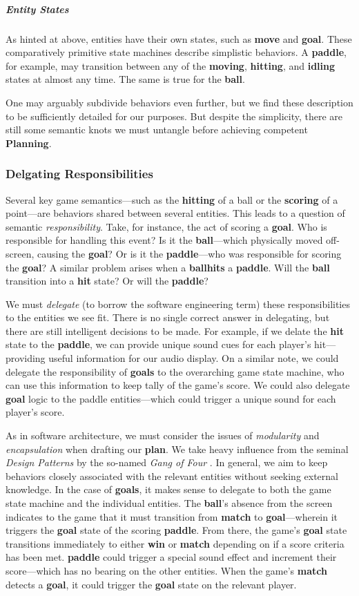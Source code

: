 \documentclass{report}
\newcommand{\plan}{\textbf{Planning}\xspace}
\newcommand{\state}[1]{\textbf{#1}}
\newcommand{\pad}{\textbf{paddle}\xspace}
\newcommand{\ball}{\textbf{ball}\xspace}
\begin{document}
\subparagraph{Entity States}
As hinted at above, entities have their own states, such as \state{move} and \state{goal}. These comparatively primitive state machines describe simplistic behaviors. A \pad, for example, may transition between any of the  \state{moving}, \state{hitting}, and \state{idling} states at almost any time. The same is true for the \ball.

One may arguably subdivide behaviors even further, but we find these description to be sufficiently detailed for our purposes. But despite the simplicity, there are still some semantic knots we must untangle before achieving competent \plan. 

\subsubsection{Delgating Responsibilities}

Several key game semantics---such as the \state{hitting} of a ball or the \state{scoring} of a point---are behaviors shared between several entities. This leads to a question of semantic \emph{responsibility}. Take, for instance, the act of scoring a \state{goal}. Who is responsible for handling this event? Is it the \ball---which physically moved off-screen, causing the \state{goal}? Or is it the \pad---who was responsible for scoring the \state{goal}? A similar problem arises when a \ball \state{hits} a \pad. Will the \ball transition into a \state{hit} state? Or will the \pad? 

We must \emph{delegate} (to borrow the software engineering term) these responsibilities to the entities we see fit. There is no single correct answer in delegating, but there are still intelligent decisions to be made. For example, if we delate the \state{hit} state to the \pad, we can provide unique sound cues for each player's hit---providing useful information for our audio display. On a similar note, we could delegate the responsibility of \state{goals} to the overarching game state machine, who can use this information to keep tally of the game's score. We could also delegate \state{goal} logic to the paddle entities---which could trigger a unique sound for each player's score.

As in software architecture, we must consider the issues of \emph{modularity} and \emph{encapsulation} when drafting our \state{plan}. We take heavy influence from the seminal \emph{Design Patterns} by the so-named \emph{Gang of Four} \cite{gamma1994design}. In general, we aim to keep behaviors closely associated with the relevant entities without seeking external knowledge. In the case of \state{goals}, it makes sense to delegate to both the game state machine and the individual entities. The \ball's absence from the screen indicates to the game that it must transition from \state{match} to \state{goal}---wherein it triggers the \state{goal} state of the scoring \pad. From there, the game's \state{goal} state transitions immediately to either \state{win} or \state{match} depending on if a score criteria has been met.  \pad could trigger a special sound effect and increment their score---which has no bearing on the other entities. When the game's \state{match} detects a \state{goal}, it could trigger the \state{goal} state on the relevant player. 
\end{document}
